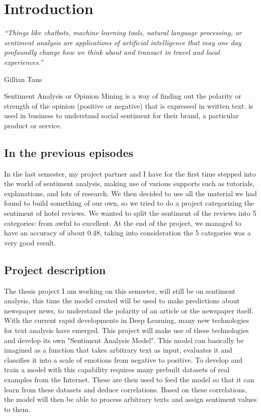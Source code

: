\section[Introduction]{Introduction}
\epigraph{\centering \textit{“Things like chatbots, machine learning tools, natural language processing, or sentiment analysis are applications of artificial intelligence that may one day profoundly change how we think about and transact in travel and local experiences.”}}{Gillian Tans}

Sentiment Analysis or Opinion Mining is a way of finding out the polarity or strength of the opinion (positive or negative) that is expressed in written text.
is used in business to understand social sentiment for their brand, a particular product or service.

\subsection[In the previous episodes]{In the previous episodes}
In the last semester, my project partner and I have for the first time stepped into the world of sentiment analysis, making use of various supports such as tutorials, explanations, and lots of research.
We then decided to use all the material we had found to build something of our own, so we tried to do a project categorizing the sentiment of hotel reviews.
We wanted to split the sentiment of the reviews into 5 categories: from awful to excellent.
At the end of the project, we managed to have an accuracy of about 0.48, taking into consideration the 5 categories was a very good result.


\subsection[Project description]{Project description}
\label{main}
The thesis project I am working on this semester, will still be on sentiment analysis, this time the model created will be used to make predictions about newspaper news, to understand the polarity of an article or the newspaper itself.
With the current rapid developments in Deep Learning, many new technologies for text analysis have emerged.
This project will make use of these technologies and develop its own "Sentiment Analysis Model".
This model can basically be imagined as a function that takes arbitrary text as input, evaluates it and classifies it into a scale of emotions from negative to positive.
To develop and train a model with this capability requires many prebuilt datasets of real examples from the Internet. These are then used to feed the model so that it can learn from these datasets and deduce correlations. Based on these correlations, the model will then be able to process arbitrary texts and assign sentiment values to them.


